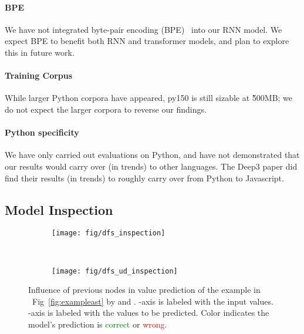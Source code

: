 \documentclass[nonacm, sigconf]{acmart}
\newcommand{\figref}[1]{Fig~\ref{#1}}
\begin{document}
\paragraph{BPE}
We have not integrated byte-pair encoding (BPE)~\cite{karampatsis2020big-bpe} into our RNN model. We expect BPE to benefit both RNN and transformer models, and plan to explore this in future work.

\paragraph{Training Corpus}
While larger Python corpora have appeared,  py150 is still sizable at \~ 500MB; we do not expect the larger corpora to reverse our findings.

\paragraph{Python specificity}
We have only carried out evaluations on Python, and have not demonstrated that our results would carry over (in trends) to other languages.  The Deep3 paper did find their results (in trends) to roughly carry over from Python to Javascript.



 
\subsection{Model Inspection}
\label{sec:inspection}

\begin{figure}
    \centering
    \begin{subfigure}[b]{0.5\textwidth}
        \texttt{[image: fig/dfs\_inspection]}
        \caption{\DFS}
        \label{fig:dfs-pred-influence}
    \end{subfigure}
    \\
\begin{subfigure}[b]{0.5\textwidth}
        \texttt{[image: fig/dfs\_ud\_inspection]}
        \caption{\TreeRel}
        \label{fig:dfs-ud-pred-influence}
    \end{subfigure}
    \caption{Influence of previous nodes in value prediction of the example in ~\figref{fig:exampleast} by \DFS and \TreeRel.
    -axis is labeled with the input values. 
    -axis is labeled with the values to be predicted. 
    Color indicates the model's prediction is \textcolor{green}{correct} or \textcolor{red}{wrong}.}
    \label{fig:pred-influence}
\end{figure}
\end{document}
